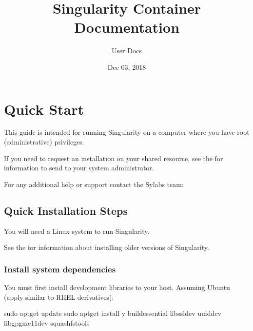 \documentclass[letterpaper,10pt,english]{sphinxmanual}
\title{Singularity Container Documentation}
\date{Dec 03, 2018}
\author{User Docs}
\begin{document}
\maketitle
\sphinxtableofcontents
{}\label{\detokenize{index::doc}}



\chapter{Quick Start}
\label{\detokenize{quick_start:quick-start}}\label{\detokenize{quick_start:id1}}\label{\detokenize{quick_start::doc}}\label{\detokenize{quick_start:sec-quickstart}}
This guide is intended for running Singularity on a computer where you
have root (administrative) privileges.

If you need to request an installation on your shared resource, see the
 for
information to send to your system administrator.

For any additional help or support contact the Sylabs team:


\section{Quick Installation Steps}
\label{\detokenize{quick_start:quick-installation-steps}}\label{\detokenize{quick_start:quick-installation}}
You will need a Linux system to run Singularity.

See the {\hyperref[\detokenize{installation:installation}]{}} for information about installing
older versions of Singularity.


\subsection{Install system dependencies}
\label{\detokenize{quick_start:install-system-dependencies}}
You must first install development libraries to your host. Assuming Ubuntu
(apply similar to RHEL derivatives):

%
\begin{sphinxVerbatim}[commandchars=\\\{\}]
\PYGZdl{} sudo apt\PYGZhy{}get update \PYGZam{}\PYGZam{} sudo apt\PYGZhy{}get install \PYGZhy{}y \PYGZbs{}
    build\PYGZhy{}essential \PYGZbs{}
    libssl\PYGZhy{}dev \PYGZbs{}
    uuid\PYGZhy{}dev \PYGZbs{}
    libgpgme11\PYGZhy{}dev \PYGZbs{}
    squashfs\PYGZhy{}tools
\end{sphinxVerbatim}
\end{document}
